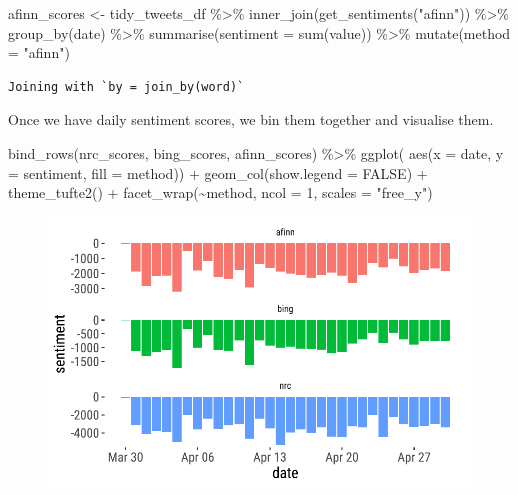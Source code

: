 \documentclass[
  letterpaper,
  DIV=11,
  numbers=noendperiod]{scrreprt}
\newenvironment{Shaded}{\begin{snugshade}}{\end{snugshade}}
\newcommand{\AttributeTok}[1]{\textcolor[rgb]{0.40,0.45,0.13}{#1}}
\newcommand{\ConstantTok}[1]{\textcolor[rgb]{0.56,0.35,0.01}{#1}}
\newcommand{\DecValTok}[1]{\textcolor[rgb]{0.68,0.00,0.00}{#1}}
\newcommand{\FunctionTok}[1]{\textcolor[rgb]{0.28,0.35,0.67}{#1}}
\newcommand{\NormalTok}[1]{\textcolor[rgb]{0.00,0.23,0.31}{#1}}
\newcommand{\OtherTok}[1]{\textcolor[rgb]{0.00,0.23,0.31}{#1}}
\newcommand{\SpecialCharTok}[1]{\textcolor[rgb]{0.37,0.37,0.37}{#1}}
\newcommand{\StringTok}[1]{\textcolor[rgb]{0.13,0.47,0.30}{#1}}
\begin{document}
\begin{Shaded}
\begin{Highlighting}[]
\NormalTok{afinn\_scores }\OtherTok{\textless{}{-}}\NormalTok{ tidy\_tweets\_df }\SpecialCharTok{\%\textgreater{}\%}
  \FunctionTok{inner\_join}\NormalTok{(}\FunctionTok{get\_sentiments}\NormalTok{(}\StringTok{"afinn"}\NormalTok{)) }\SpecialCharTok{\%\textgreater{}\%}
  \FunctionTok{group\_by}\NormalTok{(date) }\SpecialCharTok{\%\textgreater{}\%} 
  \FunctionTok{summarise}\NormalTok{(}\AttributeTok{sentiment =} \FunctionTok{sum}\NormalTok{(value)) }\SpecialCharTok{\%\textgreater{}\%} 
  \FunctionTok{mutate}\NormalTok{(}\AttributeTok{method =} \StringTok{"afinn"}\NormalTok{)}
\end{Highlighting}
\end{Shaded}

\begin{verbatim}
Joining with `by = join_by(word)`
\end{verbatim}

Once we have daily sentiment scores, we bin them together and visualise
them.

\begin{Shaded}
\begin{Highlighting}[]
\FunctionTok{bind\_rows}\NormalTok{(nrc\_scores,}
\NormalTok{          bing\_scores,}
\NormalTok{          afinn\_scores) }\SpecialCharTok{\%\textgreater{}\%}
  \FunctionTok{ggplot}\NormalTok{( }\FunctionTok{aes}\NormalTok{(}\AttributeTok{x =}\NormalTok{ date, }\AttributeTok{y =}\NormalTok{ sentiment, }\AttributeTok{fill =}\NormalTok{ method)) }\SpecialCharTok{+}
  \FunctionTok{geom\_col}\NormalTok{(}\AttributeTok{show.legend =} \ConstantTok{FALSE}\NormalTok{) }\SpecialCharTok{+}
  \FunctionTok{theme\_tufte2}\NormalTok{() }\SpecialCharTok{+}
  \FunctionTok{facet\_wrap}\NormalTok{(}\SpecialCharTok{\textasciitilde{}}\NormalTok{method, }\AttributeTok{ncol =} \DecValTok{1}\NormalTok{, }\AttributeTok{scales =} \StringTok{"free\_y"}\NormalTok{)}
\end{Highlighting}
\end{Shaded}

\begin{figure}[H]

{\centering \includegraphics{sentiment-analysis_files/figure-pdf/unnamed-chunk-27-1.pdf}

}

\end{figure}
\end{document}

